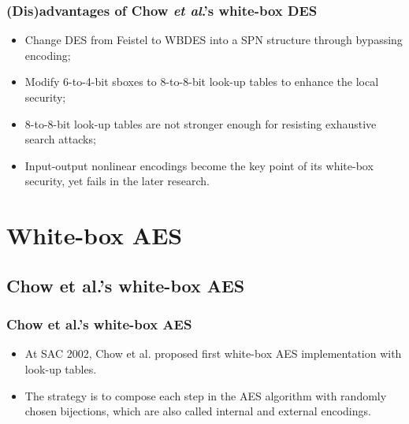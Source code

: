 \documentclass{beamer}
\begin{document}
\frame
{
\frametitle{(Dis)advantages of Chow \textit{et al}.'s white-box DES}
\begin{itemize}
    \item Change DES from Feistel to WBDES into a SPN structure through bypassing encoding;
    \item Modify 6-to-4-bit sboxes to 8-to-8-bit look-up tables to enhance the local security;
    \item 8-to-8-bit look-up tables are not stronger enough for resisting exhaustive search attacks;
    \item Input-output nonlinear encodings become the key point of its white-box security, yet fails in the later research.
\end{itemize}

}

\section{White-box AES}
\subsection{Chow et al.'s white-box AES}

\frame
{
\frametitle{Chow et al.'s white-box AES}
\begin{itemize}
\item At SAC 2002, Chow et al. proposed first white-box AES implementation with look-up tables.
\item The strategy is to compose each step in the AES algorithm with randomly chosen bijections, which are also called \textcolor[rgb]{1.00,0.00,0.00}{internal and external encodings}.
\end{itemize}

\begin{center}
\end{center}
}
\end{document}
